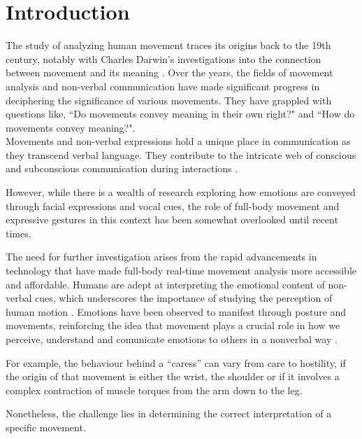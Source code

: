 \chapter{Introduction}
The study of analyzing human movement traces its origins back to the 19th century, notably with Charles Darwin's investigations into the connection between movement and its meaning \cite{darwin}. 
Over the years, the fields of movement analysis and non-verbal communication have made significant progress in deciphering the significance of various movements. 
They have grappled with questions like, “Do movements convey meaning in their own right?" and “How do movements convey meaning?".\\
Movements and non-verbal expressions hold a unique place in communication as they transcend verbal language.
They contribute to the intricate web of conscious and subconscious communication during interactions \cite{Daly:1988, laffaye:2013}. 

However, while there is a wealth of research exploring how emotions are conveyed through facial expressions and vocal cues, the role of full-body movement and expressive gestures in this context has been somewhat overlooked until recent times.

The need for further investigation arises from the rapid advancements in technology that have made full-body real-time movement analysis more accessible and affordable. 
Humans are adept at interpreting the emotional content of non-verbal cues, which underscores the importance of studying the perception of human motion \cite{samadani:2011}. 
Emotions have been observed to manifest through posture and movements, reinforcing the idea that movement plays a crucial role in how we perceive, understand and comunicate emotions to others in a nonverbal way \cite{gelder:2009,kleinsmith:2013,karg:2013}.

For example, the behaviour behind a “caress” can vary from care to hostility, 
if the origin of that movement is either the wrist, the shoulder or if it involves a complex 
contraction of muscle torques from the arm down to the leg. 

Nonetheless, the challenge lies in determining the correct interpretation of a specific movement.
    
